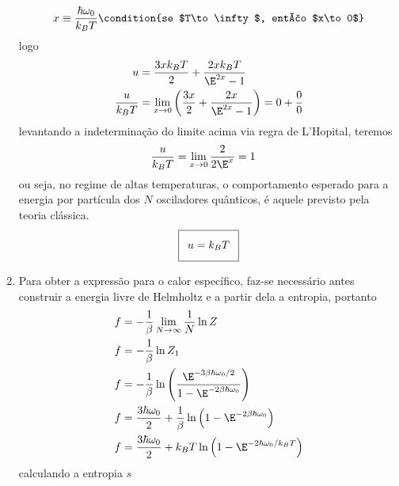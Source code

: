 \begin{prob}
\begin{sol}
\begin{enumerate}[label=\alph *)]
      \begin{dmath*}
        x\equiv \frac{\hbar\omega_0}{k_BT} \condition{se $T\to\infty$, então $x\to 0$}
      \end{dmath*}
      logo
      \begin{align}
        \begin{split}
          u&=\frac{3xk_BT}{2}+\frac{2xk_BT}{\E^{2x}-1}\\
          \frac{u}{k_BT}&=\lim_{x\to 0}\left(\frac{3x}{2}+\frac{2x}{\E^{2x}-1}\right)=0+\frac{0}{0}
        \end{split}
      \end{align}
      levantando a indeterminação do limite acima via regra de L'Hopital, teremos
      \begin{align}
        \begin{split}
          \frac{u}{k_BT}&=\lim_{x\to 0}\frac{2}{2\E^x}=1
        \end{split}
      \end{align}
      ou seja, no regime de altas temperaturas, o comportamento esperado para a energia por partícula dos $N$ osciladores quânticos, é aquele previsto pela teoria clássica.
      \begin{align}
        \addtolength{\fboxsep}{5pt}
        \boxed{
          \begin{gathered}
            u= k_BT
          \end{gathered}
        }
      \end{align}
      \item Para obter a expressão para o calor específico, faz-se necessário antes construir a energia livre de Helmholtz e a partir dela a entropia, portanto
      \begin{align}
        \begin{split}
          f&=-\frac{1}{\beta}\lim_{N\to\infty}\frac{1}{N}\ln Z\\
          f&=-\frac{1}{\beta}\ln Z_1\\
          f&=-\frac{1}{\beta}\ln\left(\frac{\E^{-3\beta\hbar\omega_0/2}}{1-\E^{-2\beta\hbar\omega_0}}\right)\\
          f&=\frac{3\hbar\omega_0}{2}+\frac{1}{\beta}\ln\left(1-\E^{-2\beta\hbar\omega_0}\right)\\
          f&=\frac{3\hbar\omega_0}{2}+k_BT\ln\left(1-\E^{-2\hbar\omega_0/k_BT}\right)
        \end{split}
      \end{align}
      calculando a entropia $s$
      \begin{align}

\end{align}
\end{enumerate}
\end{sol}
\end{prob}
